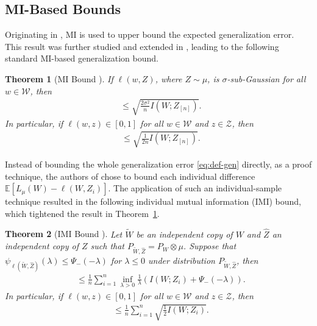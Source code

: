 \documentclass[onecolumn,romanappendices,10pt]{IEEEtran}
\newtheorem{theorem}{Theorem}
\newcommand{\Wcal}{{\mathcal W}}
\newcommand{\Zcal}{{\mathcal Z}}
\newcommand{\EE}{{\mathbb{E}}}
\DeclareMathOperator{\gen}{\overline{gen}}
\begin{document}
	\subsection{MI-Based Bounds}
	Originating in \cite{russo2016controlling}, MI is used to upper bound the expected generalization error. This result was further studied and extended in \cite{xu2017information}, leading to the following standard MI-based generalization bound.
	\begin{theorem}[MI Bound \cite{xu2017information}] \label{thm:MI} 
		If $\ell(w, Z)$, where $Z \sim \mu$, is $\sigma$-sub-Gaussian for all $w \in \Wcal$, then
		\begin{equation}
			\begin{aligned}
				\gen \leq \sqrt{\frac{2\sigma^2}{n} I(W; Z_{[n]})}. 
			\end{aligned}
		\end{equation}
		In particular, if $\ell(w, z) \in [0, 1]$ for all $w \in \Wcal$ and $z \in \Zcal$, then
		\begin{equation}
			\begin{aligned}
				\gen \leq \sqrt{\frac{1}{2n} I(W; Z_{[n]})}. 
			\end{aligned}
			\label{eq:MI}
		\end{equation}
	\end{theorem}
	Instead of bounding the whole generalization error \eqref{eq:def-gen} directly, as a proof technique, the authors of \cite{bu2020tightening} chose to bound each individual difference $\EE \left[ L_{\mu}(W) - \ell(W,Z_i) \right]$. The application of such an individual-sample technique resulted in the following individual mutual information (IMI) bound, which tightened the result in Theorem~\ref{thm:MI}. 
	\begin{theorem}[IMI Bound \cite{bu2020tightening}] \label{thm:IMI} 
		Let $\tilde{W}$ be an independent copy of $W$ and $\hat{Z}$ an independent copy of $Z$ such that $P_{\tilde{W},\hat{Z}} = P_W \otimes \mu$. Suppose that $\psi_{\ell(\tilde{W}, \hat{Z})}(\lambda) \leq \Psi_{-}(-\lambda)$ for $\lambda \leq 0$ under distribution $P_{\tilde{W},\hat{Z}}$, then
		\begin{equation}
			\begin{aligned}
				\gen \leq \frac{1}{n} \sum_{i=1}^n \inf_{\lambda > 0} \frac{1}{\lambda} \left( I(W; Z_i) + \Psi_{-}(-\lambda) \right).
			\end{aligned}\label{eq:gen-IMI}
		\end{equation}
		In particular, if $\ell(w, z) \in [0, 1]$ for all $w \in \Wcal$ and $z \in \Zcal$, then
		\begin{equation}
			\begin{aligned}
				\gen \leq \frac{1}{n} \sum_{i=1}^{n} \sqrt{\frac{1}{2} I(W; Z_i)}. 
			\end{aligned}
			\label{eq:IMI}
		\end{equation}
	\end{theorem}
	
\end{document}
